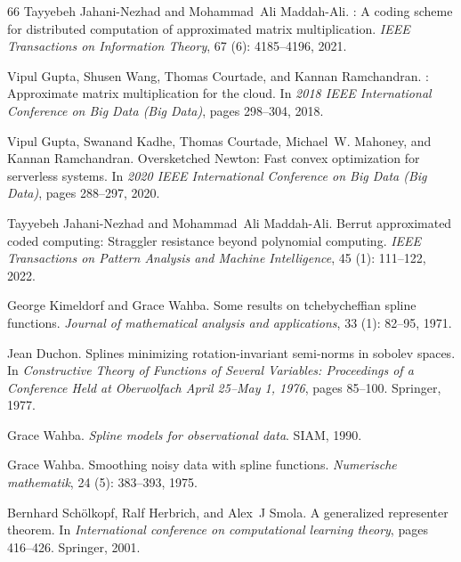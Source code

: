 \documentclass{article}
\begin{document}
\begin{thebibliography}{66}
Tayyebeh Jahani-Nezhad and Mohammad~Ali Maddah-Ali.
: A coding scheme for distributed computation of approximated matrix multiplication.
\newblock \emph{IEEE Transactions on Information Theory}, 67 (6): 4185--4196, 2021.

Vipul Gupta, Shusen Wang, Thomas Courtade, and Kannan Ramchandran.
: Approximate matrix multiplication for the cloud.
\newblock In \emph{2018 IEEE International Conference on Big Data (Big Data)}, pages 298--304, 2018{}.

Vipul Gupta, Swanand Kadhe, Thomas Courtade, Michael~W. Mahoney, and Kannan Ramchandran.
\newblock Oversketched {Newton}: Fast convex optimization for serverless systems.
\newblock In \emph{2020 IEEE International Conference on Big Data (Big Data)}, pages 288--297, 2020.

Tayyebeh Jahani-Nezhad and Mohammad~Ali Maddah-Ali.
\newblock Berrut approximated coded computing: Straggler resistance beyond polynomial computing.
\newblock \emph{IEEE Transactions on Pattern Analysis and Machine Intelligence}, 45 (1): 111--122, 2022.

George Kimeldorf and Grace Wahba.
\newblock Some results on tchebycheffian spline functions.
\newblock \emph{Journal of mathematical analysis and applications}, 33 (1): 82--95, 1971.

Jean Duchon.
\newblock Splines minimizing rotation-invariant semi-norms in sobolev spaces.
\newblock In \emph{Constructive Theory of Functions of Several Variables: Proceedings of a Conference Held at Oberwolfach April 25--May 1, 1976}, pages 85--100. Springer, 1977.

Grace Wahba.
\newblock \emph{Spline models for observational data}.
\newblock SIAM, 1990.

Grace Wahba.
\newblock Smoothing noisy data with spline functions.
\newblock \emph{Numerische mathematik}, 24 (5): 383--393, 1975.

Bernhard Sch{\"o}lkopf, Ralf Herbrich, and Alex~J Smola.
\newblock A generalized representer theorem.
\newblock In \emph{International conference on computational learning theory}, pages 416--426. Springer, 2001.


\end{thebibliography}
\end{document}
